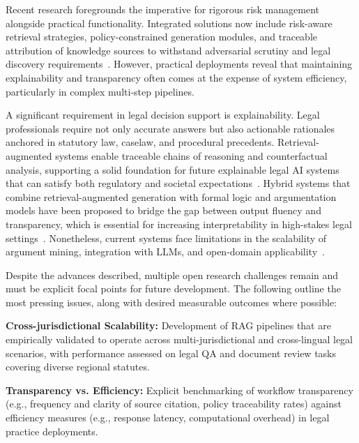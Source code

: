 \documentclass[sigconf]{acmart}
\begin{document}
Recent research foregrounds the imperative for rigorous risk management alongside practical functionality. Integrated solutions now include risk-aware retrieval strategies, policy-constrained generation modules, and traceable attribution of knowledge sources to withstand adversarial scrutiny and legal discovery requirements~\cite{ref2, ref3, ref5, ref8, ref10, ref13, ref14, ref15, ref16, ref17, ref18, ref19, ref20, ref21, ref22, ref23, ref24, ref25, ref26, ref29, ref30, ref32, ref33, ref34, ref36, ref37, ref38, ref39, ref40, ref43, ref45, ref46, ref49, ref50, ref54, ref55, ref63}. However, practical deployments reveal that maintaining explainability and transparency often comes at the expense of system efficiency, particularly in complex multi-step pipelines.

A significant requirement in legal decision support is explainability. Legal professionals require not only accurate answers but also actionable rationales anchored in statutory law, caselaw, and procedural precedents. Retrieval-augmented systems enable traceable chains of reasoning and counterfactual analysis, supporting a solid foundation for future explainable legal AI systems that can satisfy both regulatory and societal expectations~\cite{ref63}. Hybrid systems that combine retrieval-augmented generation with formal logic and argumentation models have been proposed to bridge the gap between output fluency and transparency, which is essential for increasing interpretability in high-stakes legal settings~\cite{ref13}. Nonetheless, current systems face limitations in the scalability of argument mining, integration with LLMs, and open-domain applicability~\cite{ref13}.

Despite the advances described, multiple open research challenges remain and must be explicit focal points for future development. The following outline the most pressing issues, along with desired measurable outcomes where possible:

\textbf{Cross-jurisdictional Scalability:} Development of RAG pipelines that are empirically validated to operate across multi-jurisdictional and cross-lingual legal scenarios, with performance assessed on legal QA and document review tasks covering diverse regional statutes.

\textbf{Transparency vs. Efficiency:} Explicit benchmarking of workflow transparency (e.g., frequency and clarity of source citation, policy traceability rates) against efficiency measures (e.g., response latency, computational overhead) in legal practice deployments.
\end{document}
